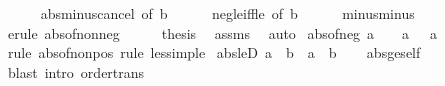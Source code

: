 \begin{isabellebody}
\ \ \ \ \isamarkupfalse%
\ abs{\isacharunderscore}{\kern0pt}minus{\isacharunderscore}{\kern0pt}cancel\ {\isacharbrackleft}{\kern0pt}of\ {\isacharquery}{\kern0pt}b{\isacharbrackright}{\kern0pt}\isanewline
\ \ \ \ \isamarkupfalse%
\ neg{\isacharunderscore}{\kern0pt}le{\isacharunderscore}{\kern0pt}{}{\isacharunderscore}{\kern0pt}iff{\isacharunderscore}{\kern0pt}le\ {\isacharbrackleft}{\kern0pt}of\ {\isacharquery}{\kern0pt}b{\isacharbrackright}{\kern0pt}\isanewline
\ \ \ \ \isamarkupfalse%
\ minus{\isacharunderscore}{\kern0pt}minus\ \isamarkupfalse%
\ {\isacharparenleft}{\kern0pt}erule\ abs{\isacharunderscore}{\kern0pt}of{\isacharunderscore}{\kern0pt}nonneg{\isacharparenright}{\kern0pt}\isanewline
\ \ \isamarkupfalse%
\ \isamarkupfalse%
\ {\isacharquery}{\kern0pt}thesis\ \isamarkupfalse%
\ assms\ \isamarkupfalse%
\ auto\isanewline
{}\isamarkupfalse%
%
\endisatagproof
{\isafoldproof}%
%
\isadelimproof
\isanewline
%
\endisadelimproof
\isanewline
{}\isamarkupfalse%
\ abs{\isacharunderscore}{\kern0pt}of{\isacharunderscore}{\kern0pt}neg{\isacharcolon}{\kern0pt}\ {\isachardoublequoteopen}a\ {\isacharless}{\kern0pt}\ {}\ {\isasymLongrightarrow}\ {\isasymbar}a{\isasymbar}\ {\isacharequal}{\kern0pt}\ {\isacharminus}{\kern0pt}\ a{\isachardoublequoteclose}\isanewline
%
\isadelimproof
\ \ %
\endisadelimproof
%
\isatagproof
{}\isamarkupfalse%
\ {\isacharparenleft}{\kern0pt}rule\ abs{\isacharunderscore}{\kern0pt}of{\isacharunderscore}{\kern0pt}nonpos{\isacharparenright}{\kern0pt}\ {\isacharparenleft}{\kern0pt}rule\ less{\isacharunderscore}{\kern0pt}imp{\isacharunderscore}{\kern0pt}le{\isacharparenright}{\kern0pt}%
\endisatagproof
{\isafoldproof}%
%
\isadelimproof
\isanewline
%
\endisadelimproof
\isanewline
{}\isamarkupfalse%
\ abs{\isacharunderscore}{\kern0pt}le{\isacharunderscore}{\kern0pt}D{}{\isacharcolon}{\kern0pt}\ {\isachardoublequoteopen}{\isasymbar}a{\isasymbar}\ {\isasymle}\ b\ {\isasymLongrightarrow}\ a\ {\isasymle}\ b{\isachardoublequoteclose}\isanewline
%
\isadelimproof
\ \ %
\endisadelimproof
%
\isatagproof
{}\isamarkupfalse%
\ abs{\isacharunderscore}{\kern0pt}ge{\isacharunderscore}{\kern0pt}self\ \isamarkupfalse%
\ {\isacharparenleft}{\kern0pt}blast\ intro{\isacharcolon}{\kern0pt}\ order{\isacharunderscore}{\kern0pt}trans{\isacharparenright}{\kern0pt}%
\endisatagproof
{\isafoldproof}%
%
\isadelimproof

\end{isabellebody}
